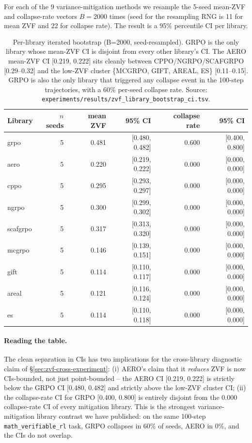For each of the 9 variance-mitigation methods we resample the
5-seed mean-ZVF and collapse-rate vectors $B=2000$ times (seed for
the resampling RNG is 11 for mean ZVF and 22 for collapse rate). The
result is a 95\% percentile CI per library.

\begin{table}[htbp]
\centering
\small
\begin{tabular}{lrrrrr}
\toprule
Library & $n$ seeds & mean ZVF & 95\% CI & collapse rate & 95\% CI \\
\midrule
grpo       & 5 & 0.481 & [0.480, 0.482] & 0.600 & [0.400, 0.800] \\
aero       & 5 & 0.220 & [0.219, 0.222] & 0.000 & [0.000, 0.000] \\
cppo       & 5 & 0.295 & [0.293, 0.297] & 0.000 & [0.000, 0.000] \\
ngrpo      & 5 & 0.300 & [0.299, 0.302] & 0.000 & [0.000, 0.000] \\
scafgrpo   & 5 & 0.317 & [0.313, 0.320] & 0.000 & [0.000, 0.000] \\
mcgrpo     & 5 & 0.146 & [0.139, 0.151] & 0.000 & [0.000, 0.000] \\
gift       & 5 & 0.114 & [0.110, 0.117] & 0.000 & [0.000, 0.000] \\
areal      & 5 & 0.121 & [0.116, 0.124] & 0.000 & [0.000, 0.000] \\
es         & 5 & 0.114 & [0.110, 0.118] & 0.000 & [0.000, 0.000] \\
\bottomrule
\end{tabular}
\caption{Per-library iterated bootstrap (B=2000, seed-resampled). GRPO is the
only library whose mean-ZVF CI is disjoint from every other library's CI.
The AERO mean-ZVF CI [0.219, 0.222] sits cleanly between CPPO/NGRPO/SCAFGRPO
[0.29--0.32] and the low-ZVF cluster \{MCGRPO, GIFT, AREAL, ES\}
[0.11--0.15]. GRPO is also the only library that triggered any collapse
event in the 100-step trajectories, with a 60\% per-seed collapse rate.
Source: \texttt{experiments/results/zvf\_library\_bootstrap\_ci.tsv}.}
\label{tab:zvf-library-bs}
\end{table}

\paragraph{Reading the table.}
The clean separation in CIs has two implications for the cross-library
diagnostic claim of \S\ref{sec:zvf-cross-experiment}:
(i) AERO's claim that it \emph{reduces} ZVF is now CIs-bounded, not just
point-bounded -- the AERO CI [0.219, 0.222] is strictly below the GRPO
CI [0.480, 0.482] and strictly above the low-ZVF cluster CI; (ii) the
collapse-rate CI for GRPO [0.400, 0.800] is entirely disjoint from the
0.000 collapse-rate CI of every mitigation library. This is the
strongest variance-mitigation library contrast we have published:
on the same 100-step \texttt{math\_verifiable\_rl} task, GRPO collapses
in 60\% of seeds, AERO in 0\%, and the CIs do not overlap.

